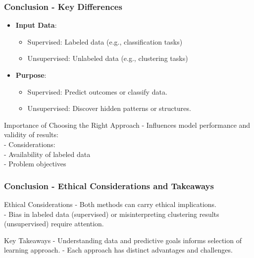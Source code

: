 \documentclass[aspectratio=169]{beamer}
\begin{document}
\begin{frame}[fragile]
    \frametitle{Conclusion - Key Differences}
    \begin{itemize}
        \item \textbf{Input Data}:
            \begin{itemize}
                \item Supervised: Labeled data (e.g., classification tasks)
                \item Unsupervised: Unlabeled data (e.g., clustering tasks)
            \end{itemize}
        \item \textbf{Purpose}:
            \begin{itemize}
                \item Supervised: Predict outcomes or classify data.
                \item Unsupervised: Discover hidden patterns or structures.
            \end{itemize}
    \end{itemize}
    
    \begin{block}{Importance of Choosing the Right Approach}
        - Influences model performance and validity of results:\\
        - Considerations: \\
            - Availability of labeled data \\
            - Problem objectives
    \end{block}
\end{frame}

\begin{frame}[fragile]
    \frametitle{Conclusion - Ethical Considerations and Takeaways}
    \begin{block}{Ethical Considerations}
        - Both methods can carry ethical implications.\\
        - Bias in labeled data (supervised) or misinterpreting clustering results (unsupervised) require attention.
    \end{block}

    \begin{block}{Key Takeaways}
        - Understanding data and predictive goals informs selection of learning approach.
        - Each approach has distinct advantages and challenges.
    \end{block}
\end{frame}
\end{document}
